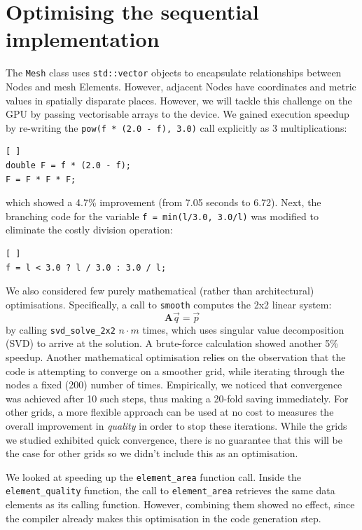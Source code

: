 \documentclass[a4paper,12pt, twocolumn]{article}
\begin{document}
\section{Optimising the sequential implementation}
The \verb+Mesh+ class uses \verb+std::vector+ objects to encapsulate relationships between Nodes and mesh Elements.
However, adjacent Nodes have coordinates and metric values in spatially disparate places.
However, we will tackle this challenge on the GPU by passing vectorisable arrays to the device.
We gained execution speedup by re-writing the \verb+pow(f * (2.0 - f), 3.0)+ call explicitly as 3 multiplications:
\begin{lstlisting}[ ]
double F = f * (2.0 - f);
F = F * F * F;
\end{lstlisting}
which showed a 4.7\% improvement (from 7.05 seconds to 6.72).
Next, the branching code for the variable \verb+f = min(l/3.0, 3.0/l)+ was modified to eliminate the costly division operation:
\begin{lstlisting}[ ]
f = l < 3.0 ? l / 3.0 : 3.0 / l;
\end{lstlisting}
We also considered few purely mathematical (rather than architectural) optimisations.
Specifically, a call to \verb+smooth+ computes the 2x2 linear system:
\[
\mathbf{A}\vec{q} = \vec{p}
\]
by calling \verb+svd_solve_2x2+ $n \cdot m$ times, which uses singular value decomposition (SVD) to arrive at the solution.
A brute-force calculation showed another 5\% speedup.
Another mathematical optimisation relies on the observation that the code is attempting to converge on a smoother grid, while iterating through the nodes a fixed (200) number of times.
Empirically, we noticed that convergence was achieved after 10 such steps, thus making a 20-fold saving immediately.
For other grids, a more flexible approach can be used at no cost to measures the overall improvement in \emph{quality} in order to stop these iterations.
While the grids we studied exhibited quick convergence, there is no guarantee that this will be the case for other grids so we didn't include this as an optimisation.

We looked at speeding up the \verb+element_area+ function call.
Inside the \verb+element_quality+ function, the call to \verb+element_area+ retrieves the same data elements as its calling function.
However, combining them showed no effect, since the compiler already makes this optimisation in the code generation step.
\end{document}
